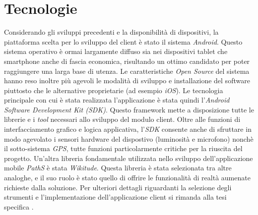 \section{Tecnologie}
Considerando gli sviluppi precedenti e la disponibilità di dispositivi, la piattaforma scelta per lo sviluppo del client è stato il sistema \emph{Android}. Questo sistema operativo è ormai largamente diffuso sia nei dispositivi tablet che smartphone anche di fascia economica, risultando un ottimo candidato per poter raggiungere una larga base di utenza. Le caratteristiche \emph{Open Source} del sistema hanno reso inoltre più agevoli le modalità di sviluppo e installazione del software piuttosto che le alternative proprietarie (ad esempio \emph{iOS}).
Le tecnologia principale con cui è stata realizzata l'applicazione è stata quindi l'\emph{Android Software Development Kit (SDK)}. Questo framework mette a disposizione tutte le librerie e i \emph{tool} necessari allo sviluppo del modulo client. Oltre alle funzioni di interfacciamento grafico e logica applicativa, l'\emph{SDK} consente anche di sfruttare in modo agevolato i sensori hardware del dispostivo (luminosità e microfono) nonchè il sotto-sistema \emph{GPS}, tutte funzioni particolarmente critiche per la riuscita del progetto.
Un'altra libreria fondamentale utilizzata nello sviluppo dell'applicazione mobile \emph{PathS} è stata \emph{Wikitude}. Questa libreria è stata selezionata tra altre analoghe, e il suo ruolo è stato quello di offrire le funzionalità di realtà aumenate richieste dalla soluzione. 
Per ulteriori dettagli riguardanti la selezione degli strumenti e l'implementazione dell'applicazione client si rimanda alla tesi specifica \cite{tesitombolini}.

